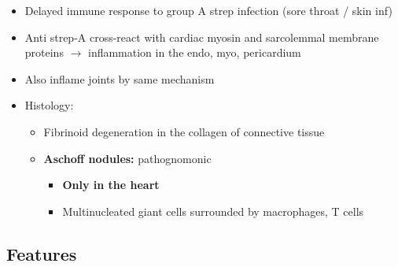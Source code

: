 \documentclass[
  12pt,
]{memoir}
\providecommand{\tightlist}{%
  \setlength{\itemsep}{0pt}\setlength{\parskip}{0pt}}
\begin{document}
\begin{itemize}
\tightlist
\item
  Delayed immune response to group A strep infection (sore throat / skin
  inf)
\item
  Anti strep-A cross-react with cardiac myosin and sarcolemmal membrane
  proteins \(\rightarrow\) inflammation in the endo, myo, pericardium
\item
  Also inflame joints by same mechanism
\item
  Histology:

  \begin{itemize}
  \tightlist
  \item
    Fibrinoid degeneration in the collagen of connective tissue
  \item
    \textbf{Aschoff nodules:} pathognomonic

    \begin{itemize}
    \tightlist
    \item
      \textbf{Only in the heart}
    \item
      Multinucleated giant cells surrounded by macrophages, T cells
    \end{itemize}
  \end{itemize}
\end{itemize}

\hypertarget{features-6}{%
\subsection{Features}\label{features-6}}
\end{document}
